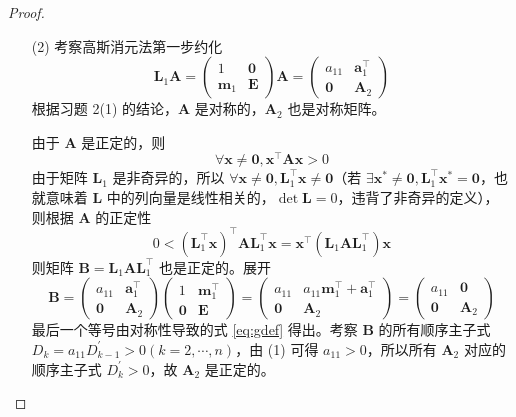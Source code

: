 \documentclass{sjtuarticle}
\begin{document}
\begin{itemize}
\begin{proof}
\begin{itemize}
            \item[(2)] 考察高斯消元法第一步约化
            \begin{equation*}
                \bm{L}_1\bm{A}=\begin{pmatrix}
                    1 & \bm{0} \\
                    \bm{m}_1 & \bm{E} 
                \end{pmatrix}\bm{A}=\begin{pmatrix}
                    a_{11} & \bm{a}_1^\top \\
                    \bm{0} & \bm{A}_2
                \end{pmatrix}
            \end{equation*}
            根据习题 2(1) 的结论，$\bm{A}$ 是对称的，$\bm{A}_2$ 也是对称矩阵。
            
            由于 $\bm{A}$ 是正定的，则
            \begin{equation}\label{eq:xax}
                \forall \bm{x}\neq \bm{0}, \bm{x}^\top\bm{A}\bm{x}>0
            \end{equation}
            由于矩阵 $\bm{L}_1$ 是非奇异的，所以 $\forall \bm{x}\neq \bm{0}, \bm{L}_1^\top\bm{x}\neq \bm{0}$（若 $\exists \bm{x}^*\neq \bm{0}, \bm{L}_1^\top\bm{x}^*=\bm{0}$，也就意味着 $\bm{L}$ 中的列向量是线性相关的，$\det \bm{L}=0$，违背了非奇异的定义），则根据 $\bm{A}$ 的正定性
            \begin{equation*}
                0<(\bm{L}_1^\top\bm{x})^\top \bm{A} \bm{L}_1^\top\bm{x}=\bm{x}^\top (\bm{L}_1 \bm{A}\bm{L}_1^\top)\bm{x}
            \end{equation*}
            则矩阵 $\bm{B}=\bm{L}_1\bm{A}\bm{L}_1^\top $ 也是正定的。展开
            \begin{equation*}
                \bm{B}=\begin{pmatrix}
                    a_{11} & \bm{a}_1^\top \\
                    \bm{0} & \bm{A}_2
                \end{pmatrix}\begin{pmatrix}
                    1 & \bm{m}_1^\top \\
                    \bm{0} & \bm{E} 
                \end{pmatrix}=\begin{pmatrix}
                    a_{11} & a_{11}\bm{m}_1^\top + \bm{a}_1^\top \\
                    \bm{0} & \bm{A}_2
                \end{pmatrix}=\begin{pmatrix}
                    a_{11} & \bm{0} \\
                    \bm{0} & \bm{A}_2
                \end{pmatrix}
            \end{equation*}
            最后一个等号由对称性导致的式 \eqref{eq:gdef} 得出。考察 $\bm{B}$ 的所有顺序主子式 $D_k=a_{11}D^\prime_{k-1}>0 (k=2,\cdots,n)$，由 (1) 可得 $a_{11}>0$，所以所有 $\bm{A}_2$ 对应的顺序主子式 $D^\prime_k>0$，故 $\bm{A}_2$ 是正定的。


\end{itemize}
\end{proof}
\end{itemize}
\end{document}
